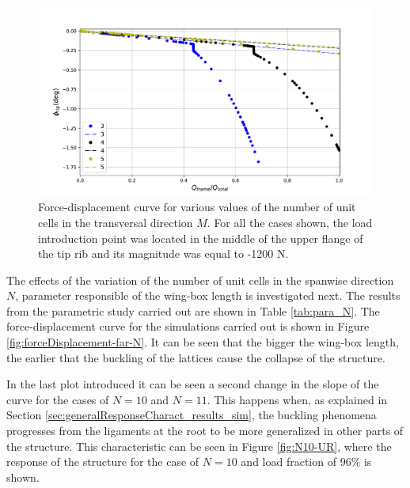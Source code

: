     \begin{figure}[!htpb] %
      \centering
      \includegraphics[width=0.8 \textwidth]{../figures/result-sim/M/force_displacement-far-1200N}
      \caption[Force-displacement curve for various values of the number of unit cells in the transversal direction]{Force-displacement curve for various values of the number of unit cells in the transversal direction $M$. For all the cases shown, the load introduction point was located in the middle of the upper flange of the tip rib and its magnitude was equal to -1200 N.}\label{fig:forceDisplacement-far-M}
    \end{figure}

    The effects of the variation of the number of unit cells in the spanwise direction $N$, parameter responsible of the wing-box length is investigated next. The results from the parametric study carried out are shown in Table \ref{tab:para_N}. The force-displacement curve for the simulations carried out is shown in Figure \ref{fig:forceDisplacement-far-N}. It can be seen that the bigger the wing-box length, the earlier that the buckling of the lattices cause the collapse of the structure.

    In the last plot introduced it can be seen a second change in the slope of the curve for the cases of $N = 10$ and $N = 11$. This happens when, as explained in Section \ref{sec:generalResponseCharact_results_sim}, the buckling phenomena progresses from the ligaments at the root to be more generalized in other parts of the structure. This characteristic can be seen in Figure \ref{fig:N10-UR}, where the response of the structure for the case of $N = 10$ and load fraction of $96\%$ is shown.

